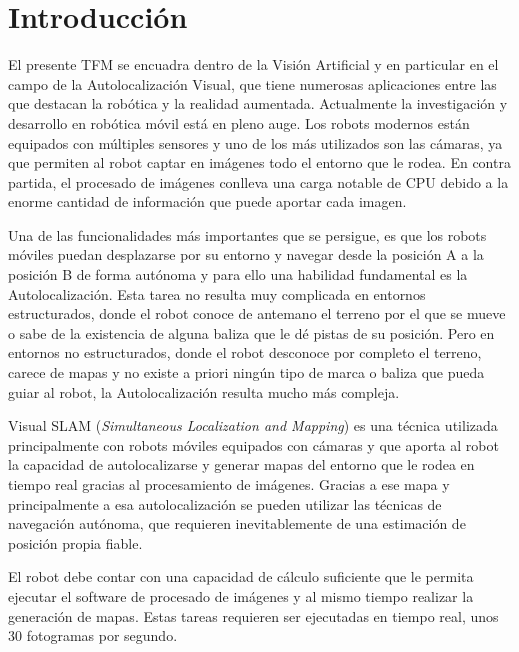 \chapter{Introducción} \label{cap:introduccion}
\setcounter{page}{1}
El presente TFM se encuadra dentro de la Visión Artificial y en particular en el campo de la Autolocalización Visual, que tiene numerosas aplicaciones entre las que destacan la robótica y la realidad aumentada.
Actualmente la investigación y desarrollo en robótica móvil está en pleno auge. Los robots modernos están equipados con múltiples sensores y uno de los más utilizados son las cámaras, ya que permiten al robot captar en imágenes todo el entorno que le rodea. En contra partida, el procesado de imágenes conlleva una carga notable de CPU debido a la enorme cantidad de información que puede aportar cada imagen.

Una de las funcionalidades más importantes que se persigue, es que los robots móviles puedan desplazarse por su entorno y navegar desde la posición A a la posición B de forma autónoma y para ello una habilidad fundamental es la Autolocalización. 
Esta tarea no resulta muy complicada en entornos estructurados, donde el robot conoce de antemano el terreno por el que se mueve o sabe de la existencia de alguna baliza que le dé pistas de su posición.
Pero en entornos no estructurados, donde el robot desconoce por completo el terreno, carece de mapas y no existe a priori ningún tipo de marca o baliza que pueda guiar al robot, la Autolocalización resulta mucho más compleja.


Visual SLAM (\textit{Simultaneous Localization and Mapping}) es una técnica utilizada principalmente con robots móviles equipados con cámaras y que aporta al robot la capacidad de autolocalizarse y generar mapas del entorno que le rodea en tiempo real gracias al procesamiento de imágenes. Gracias a ese mapa y principalmente a esa autolocalización se pueden utilizar las técnicas de navegación autónoma, que requieren inevitablemente de una estimación de posición propia fiable. 

El robot debe contar con una capacidad de cálculo suficiente que le permita ejecutar el software de procesado de imágenes y al mismo tiempo realizar la generación de mapas. Estas tareas requieren ser ejecutadas en tiempo real, unos 30 fotogramas por segundo. 



